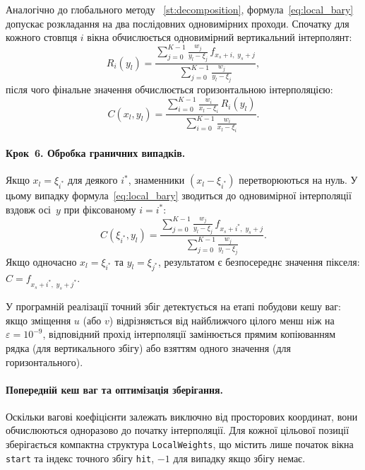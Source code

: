 Аналогічно до глобального методу ~\ref{st:decomposition},
формула~\eqref{eq:local_bary} допускає розкладання на два послідовних
одновимірних проходи. Спочатку для кожного стовпця $i$ вікна обчислюється
одновимірний вертикальний інтерполянт:
\begin{equation}
	R_i(y_l) = \frac{
		\displaystyle\sum_{j=0}^{K-1}
		\frac{w_j}{y_l - \xi_j}\, f_{x_s+i,\; y_s+j}
	}{
		\displaystyle\sum_{j=0}^{K-1}
		\frac{w_j}{y_l - \xi_j}
	},
	\label{eq:local_Ri}
\end{equation}
після чого фінальне значення обчислюється горизонтальною інтерполяцією:
\begin{equation}
	C(x_l, y_l) = \frac{
		\displaystyle\sum_{i=0}^{K-1}
		\frac{w_i}{x_l - \xi_i}\, R_i(y_l)
	}{
		\displaystyle\sum_{i=0}^{K-1}
		\frac{w_i}{x_l - \xi_i}
	}.
	\label{eq:local_separated}
\end{equation}

\paragraph{Крок~6. Обробка граничних випадків.}
Якщо $x_l = \xi_{i^*}$ для деякого $i^*$, знаменники
$(x_l - \xi_{i^*})$ перетворюються на нуль. У цьому випадку
формула~\eqref{eq:local_bary} зводиться до одновимірної інтерполяції
вздовж осі~$y$ при фіксованому $i = i^*$:
\begin{equation}
	C(\xi_{i^*}, y_l) = \frac{
		\displaystyle\sum_{j=0}^{K-1} \frac{w_j}{y_l - \xi_j}\,
		f_{x_s+i^*,\; y_s+j}
	}{
		\displaystyle\sum_{j=0}^{K-1} \frac{w_j}{y_l - \xi_j}
	}.
\end{equation}
Якщо одночасно $x_l = \xi_{i^*}$ та $y_l = \xi_{j^*}$, результатом є
безпосереднє значення пікселя: $C = f_{x_s+i^*,\; y_s+j^*}$.

У програмній реалізації точний збіг детектується на етапі побудови кешу
ваг: якщо зміщення $u$ (або $v$) відрізняється від найближчого цілого
менш ніж на $\varepsilon = 10^{-9}$, відповідний прохід інтерполяції
замінюється прямим копіюванням рядка (для вертикального збігу) або
взяттям одного значення (для горизонтального).

\paragraph{Попередній кеш ваг та оптимізація зберігання.}
Оскільки вагові коефіцієнти залежать виключно від просторових координат,
вони обчислюються одноразово до початку інтерполяції. Для кожної цільової
позиції зберігається компактна структура \texttt{LocalWeights}, що
містить лише початок вікна \texttt{start} та індекс точного збігу
\texttt{hit}, ${-}1$ для випадку якщо збігу немає.

